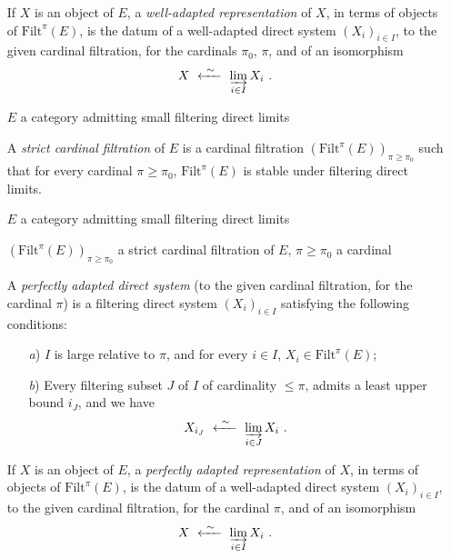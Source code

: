 \documentclass[11pt]{article}
\newcommand{\printedpage}[1]{\marginpar{\footnotesize p.~#1}}
\newcommand{\Filt}{\mathrm{Filt}}
\begin{document}
\begin{itemize}
\printedpage{63}

If $X$ is an object of $E$, a \textit{well-adapted representation} of $X$, in terms of objects of $\Filt^{\pi}(E)$, is the datum of a well-adapted direct system $(X_i)_{i\in I}$, to the given cardinal filtration, for the cardinals $\pi_0$, $\pi$, and of an isomorphism
\[
X \ \xleftarrow{\ \sim\ }\ \varinjlim_{i\in I} X_i \ .
\]

\item[\textbullet] $E$ a category admitting small filtering direct limits

A \textit{strict cardinal filtration} of $E$ is a cardinal filtration $(\Filt^{\pi}(E))_{\pi\geq\pi_0}$ such that for every cardinal $\pi \geq \pi_0$, $\Filt^{\pi}(E)$ is stable under filtering direct limits.

\item[\textbullet] $E$ a category admitting small filtering direct limits

$(\Filt^{\pi}(E))_{\pi\geq\pi_0}$ a strict cardinal filtration of $E$, \quad $\pi \geq \pi_0$ a cardinal

A \textit{perfectly adapted direct system} (to the given cardinal filtration, for the cardinal $\pi$) is a filtering direct system $(X_i)_{i\in I}$ satisfying the following conditions:
\begin{itemize}
\item[\textit{a})] $I$ is large relative to $\pi$, and for every $i \in I$, $X_i \in \Filt^{\pi}(E)$;
\item[\textit{b})] Every filtering subset $J$ of $I$ of cardinality $\leq \pi$, admits a least upper bound $i_J$, and we have
\[
X_{i_J} \ \xleftarrow{\ \sim\ }\ \varinjlim_{i\in J} X_i \ .
\]
\end{itemize}
If $X$ is an object of $E$, a \textit{perfectly adapted representation} of $X$, in terms of objects of $\Filt^{\pi}(E)$, is the datum of a well-adapted direct system $(X_i)_{i\in I}$, to the given cardinal filtration, for the cardinal $\pi$, and of an isomorphism
\[
X \ \xleftarrow{\ \sim\ }\ \varinjlim_{i\in I} X_i \ .
\]
\end{itemize}
\end{document}
